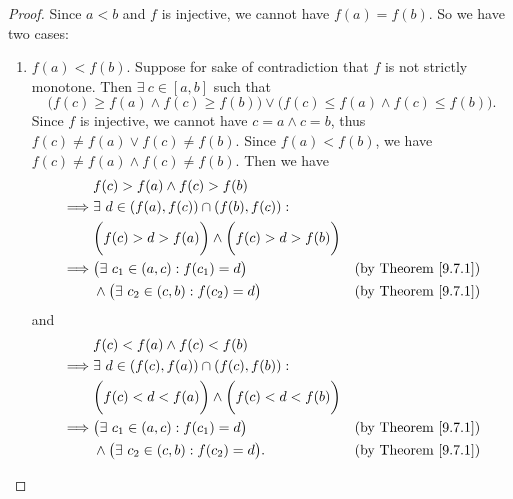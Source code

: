 \begin{proof}
    Since \(a < b\) and \(f\) is injective, we cannot have \(f(a) = f(b)\).
    So we have two cases:
    \begin{enumerate}
        \item \(f(a) < f(b)\).
              Suppose for sake of contradiction that \(f\) is not strictly monotone.
              Then \(\exists\ c \in [a, b]\) such that
              \[
                  \bigg(f(c) \geq f(a) \land f(c) \geq f(b)\bigg) \lor \bigg(f(c) \leq f(a) \land f(c) \leq f(b)\bigg).
              \]
              Since \(f\) is injective, we cannot have \(c = a \land c = b\), thus \(f(c) \neq f(a) \lor f(c) \neq f(b)\).
              Since \(f(a) < f(b)\), we have \(f(c) \neq f(a) \land f(c) \neq f(b)\).
              Then we have
              \begin{align*}
                           & f(c) > f(a) \land f(c) > f(b)                                                                   \\
                  \implies & \exists\ d \in (f(a), f(c)) \cap (f(b), f(c)) :                                                 \\
                           & \bigg(f(c) > d > f(a)\bigg) \land \bigg(f(c) > d > f(b)\bigg)                                   \\
                  \implies & \big(\exists\ c_1 \in (a, c) : f(c_1) = d\big)                & \text{(by Theorem \ref{9.7.1})} \\
                           & \land \big(\exists\ c_2 \in (c, b) : f(c_2) = d\big)          & \text{(by Theorem \ref{9.7.1})} \\
              \end{align*}
              and
              \begin{align*}
                           & f(c) < f(a) \land f(c) < f(b)                                                                   \\
                  \implies & \exists\ d \in (f(c), f(a)) \cap (f(c), f(b)) :                                                 \\
                           & \bigg(f(c) < d < f(a)\bigg) \land \bigg(f(c) < d < f(b)\bigg)                                   \\
                  \implies & \big(\exists\ c_1 \in (a, c) : f(c_1) = d\big)                & \text{(by Theorem \ref{9.7.1})} \\
                           & \land \big(\exists\ c_2 \in (c, b) : f(c_2) = d\big).         & \text{(by Theorem \ref{9.7.1})} \\

\end{align*}
\end{enumerate}
\end{proof}
